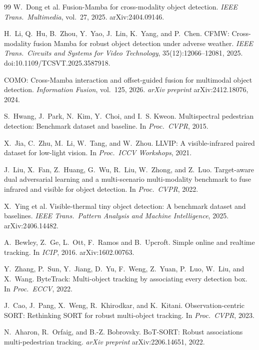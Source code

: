 \begin{thebibliography}{99}
W.~Dong et al.
Fusion-Mamba for cross-modality object detection.
\textit{IEEE Trans.\ Multimedia}, vol.~27, 2025. arXiv:2404.09146.

H.~Li, Q.~Hu, B.~Zhou, Y.~Yao, J.~Lin, K.~Yang, and P.~Chen.
CFMW: Cross-modality fusion Mamba for robust object detection under adverse
weather. \textit{IEEE Trans.\ Circuits and Systems for Video Technology},
35(12):12066--12081, 2025. doi:10.1109/TCSVT.2025.3587918.

COMO: Cross-Mamba interaction and offset-guided fusion for multimodal object
detection. \textit{Information Fusion}, vol.~125, 2026.
\textit{arXiv preprint} arXiv:2412.18076, 2024.

S.~Hwang, J.~Park, N.~Kim, Y.~Choi, and I.~S. Kweon.
Multispectral pedestrian detection: Benchmark dataset and baseline.
In \textit{Proc.\ CVPR}, 2015.

X.~Jia, C.~Zhu, M.~Li, W.~Tang, and W.~Zhou.
LLVIP: A visible-infrared paired dataset for low-light vision.
In \textit{Proc.\ ICCV Workshops}, 2021.

J.~Liu, X.~Fan, Z.~Huang, G.~Wu, R.~Liu, W.~Zhong, and Z.~Luo.
Target-aware dual adversarial learning and a multi-scenario multi-modality
benchmark to fuse infrared and visible for object detection.
In \textit{Proc.\ CVPR}, 2022.

X.~Ying et al.
Visible-thermal tiny object detection: A benchmark dataset and baselines.
\textit{IEEE Trans.\ Pattern Analysis and Machine Intelligence}, 2025.
arXiv:2406.14482.

A.~Bewley, Z.~Ge, L.~Ott, F.~Ramos and B.~Upcroft.
Simple online and realtime tracking.
In \textit{ICIP}, 2016. arXiv:1602.00763.

Y.~Zhang, P.~Sun, Y.~Jiang, D.~Yu, F.~Weng, Z.~Yuan, P.~Luo, W.~Liu, and X.~Wang.
ByteTrack: Multi-object tracking by associating every detection box.
In \textit{Proc.\ ECCV}, 2022.

J.~Cao, J.~Pang, X.~Weng, R.~Khirodkar, and K.~Kitani.
Observation-centric SORT: Rethinking SORT for robust multi-object tracking.
In \textit{Proc.\ CVPR}, 2023.

N.~Aharon, R.~Orfaig, and B.-Z. Bobrovsky.
BoT-SORT: Robust associations multi-pedestrian tracking.
\textit{arXiv preprint} arXiv:2206.14651, 2022.


\end{thebibliography}
